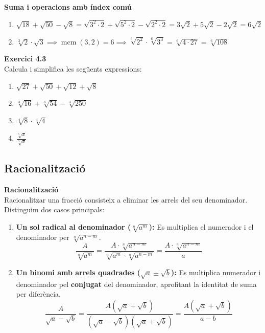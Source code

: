 \documentclass[12pt]{article}
\begin{document}
\begin{exemple}
\textbf{Suma i operacions amb índex comú}
\begin{enumerate}[label=\alph*)]
    \item $\sqrt{18} + \sqrt{50} - \sqrt{8} = \sqrt{3^2 \cdot 2} + \sqrt{5^2 \cdot 2} - \sqrt{2^2 \cdot 2} = 3\sqrt{2} + 5\sqrt{2} - 2\sqrt{2} = 6\sqrt{2}$
    \item $\sqrt[3]{2} \cdot \sqrt{3} \implies \operatorname{mcm}(3,2) = 6 \implies \sqrt[6]{2^2} \cdot \sqrt[6]{3^3} = \sqrt[6]{4 \cdot 27} = \sqrt[6]{108}$
\end{enumerate}
\end{exemple}

\begin{exercici}
\textbf{Exercici 4.3}\\
Calcula i simplifica les següents expressions:
\begin{enumerate}[label=\alph*)]
    \item $\sqrt{27} + \sqrt{50} + \sqrt{12} + \sqrt{8}$
    \item $\sqrt[3]{16} + \sqrt[3]{54} - \sqrt[3]{250}$
    \item $\sqrt[4]{8} \cdot \sqrt[4]{4}$
    \item $\frac{\sqrt[5]{x}}{\sqrt[3]{x}}$
\end{enumerate}
\end{exercici}

\subsection{Racionalització}

\begin{concept}
\textbf{Racionalització}\\
Racionalitzar una fracció consisteix a eliminar les arrels del seu denominador. Distinguim dos casos principals:

\begin{enumerate}
    \item \textbf{Un sol radical al denominador ($\sqrt[n]{a^m}$):} Es multiplica el numerador i el denominador per $\sqrt[n]{a^{n-m}}$.
    \[ \frac{A}{\sqrt[n]{a^m}} = \frac{A \cdot \sqrt[n]{a^{n-m}}}{\sqrt[n]{a^m} \cdot \sqrt[n]{a^{n-m}}} = \frac{A \cdot \sqrt[n]{a^{n-m}}}{a} \]
    \item \textbf{Un binomi amb arrels quadrades ($\sqrt{a} \pm \sqrt{b}$):} Es multiplica numerador i denominador pel \textbf{conjugat} del denominador, aprofitant la identitat de suma per diferència.
    \[ \frac{A}{\sqrt{a} - \sqrt{b}} = \frac{A(\sqrt{a} + \sqrt{b})}{(\sqrt{a} - \sqrt{b})(\sqrt{a} + \sqrt{b})} = \frac{A(\sqrt{a} + \sqrt{b})}{a - b} \]
\end{enumerate}
\end{concept}
\end{document}
